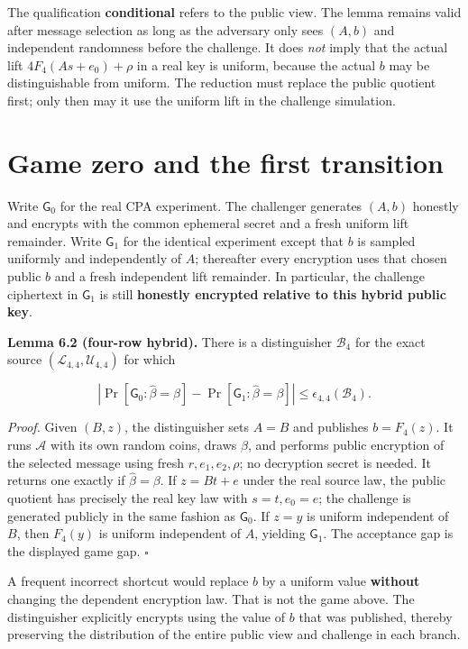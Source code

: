 \documentclass[
  11pt,
  a4paper,
  oneside]{report}
\begin{document}
The qualification \textbf{conditional} refers to the public view. The
lemma remains valid after message selection as long as the adversary
only sees \((A,b)\) and independent randomness before the challenge. It
does \emph{not} imply that the actual lift \(4F_4(As+e_0)+\rho\) in a
real key is uniform, because the actual \(b\) may be distinguishable
from uniform. The reduction must replace the public quotient first; only
then may it use the uniform lift in the challenge simulation.

\section{Game zero and the first
transition}\label{game-zero-and-the-first-transition}

Write \(\mathsf G_0\) for the real CPA experiment. The challenger
generates \((A,b)\) honestly and encrypts with the common ephemeral
secret and a fresh uniform lift remainder. Write \(\mathsf G_1\) for the
identical experiment except that \(b\) is sampled uniformly and
independently of \(A\); thereafter every encryption uses that chosen
public \(b\) and a fresh independent lift remainder. In particular, the
challenge ciphertext in \(\mathsf G_1\) is still \textbf{honestly
encrypted relative to this hybrid public key}.

\textbf{Lemma 6.2 (four-row hybrid).} There is a distinguisher
\(\mathcal B_4\) for the exact source
\((\mathcal L_{4,4},\mathcal U_{4,4})\) for which

\[
\left|\Pr[\mathsf G_0:\widehat\beta=\beta]
-\Pr[\mathsf G_1:\widehat\beta=\beta]\right|
\le\epsilon_{4,4}(\mathcal B_4).
\]

\emph{Proof.} Given \((B,z)\), the distinguisher sets \(A=B\) and
publishes \(b=F_4(z)\). It runs \(\mathcal A\) with its own random
coins, draws \(\beta\), and performs public encryption of the selected
message using fresh \(r,e_1,e_2,\rho\); no decryption secret is needed.
It returns one exactly if \(\widehat\beta=\beta\). If \(z=Bt+e\) under
the real source law, the public quotient has precisely the real key law
with \(s=t,e_0=e\); the challenge is generated publicly in the same
fashion as \(\mathsf G_0\). If \(z=y\) is uniform independent of \(B\),
then \(F_4(y)\) is uniform independent of \(A\), yielding
\(\mathsf G_1\). The acceptance gap is the displayed game gap.
\(\square\)

A frequent incorrect shortcut would replace \(b\) by a uniform value
\textbf{without} changing the dependent encryption law. That is not the
game above. The distinguisher explicitly encrypts using the value of
\(b\) that was published, thereby preserving the distribution of the
entire public view and challenge in each branch.
\end{document}
